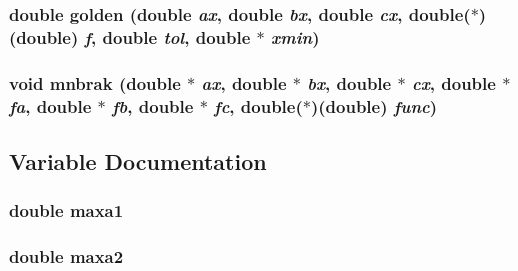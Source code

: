 \subsubsection{\setlength{\rightskip}{0pt plus 5cm}double golden (double {\em ax}, double {\em bx}, double {\em cx}, double($\ast$)(double) {\em f}, double {\em tol}, double $\ast$ {\em xmin})}\label{nrmin_8c_ac9129f52275f2d4c2469699cbcf3833}


\subsubsection{\setlength{\rightskip}{0pt plus 5cm}void mnbrak (double $\ast$ {\em ax}, double $\ast$ {\em bx}, double $\ast$ {\em cx}, double $\ast$ {\em fa}, double $\ast$ {\em fb}, double $\ast$ {\em fc}, double($\ast$)(double) {\em func})}\label{nrmin_8c_ae863d3c940914dec464bad3f8c74e30}




\subsection{Variable Documentation}
\subsubsection{\setlength{\rightskip}{0pt plus 5cm}double {\bf maxa1}\hspace{0.3cm}{\tt  [static]}}\label{nrmin_8c_dd8b94b61a613d320b3fe27af1259e10}


\subsubsection{\setlength{\rightskip}{0pt plus 5cm}double {\bf maxa2}\hspace{0.3cm}{\tt  [static]}}\label{nrmin_8c_c23cffca82c25765f2edb16deb9ce323}


